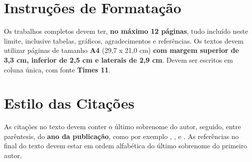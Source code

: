 \documentclass[11pt]{article}
\begin{document}
\section{Instruções de Formatação}

Os trabalhos completos devem ter, \textbf{no máximo 12 páginas}, tudo incluído neste limite, inclusive tabelas, gráficos, agradecimentos e referências.
Os textos devem utilizar páginas de tamanho \textbf{A4} (29,7 x 21,0 cm) \textbf{com margem superior de 3,3 cm, inferior de 2,5 cm e laterais de 2,9 cm}. Devem ser escritos em coluna única, com fonte \textbf{Times 11}.

\section{Estilo das Citações}

As citações no texto devem conter o último sobrenome do autor, seguido, entre parêntesis, do \textbf{ano da publicação}, como por exemplo \cite{knuth:84}, \cite{boulic:91}, e \cite{smith:99}. As referências no final do texto devem estar em ordem alfabética do último sobrenome do primeiro autor.



\end{document}
